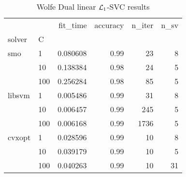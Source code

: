 \begin{table}[H]
\centering
\caption{Wolfe Dual linear $\protect \mathcal{L}_1$-SVC results}
\label{linear_dual_l1_svc_cv_results}
\begin{tabular}{llrrrr}
\toprule
       &     &  fit\_time &  accuracy &  n\_iter &  n\_sv \\
solver & C &           &           &         &       \\
\midrule
smo & 1   &  0.080608 &      0.99 &      23 &     8 \\
       & 10  &  0.138384 &      0.98 &      24 &     5 \\
       & 100 &  0.256284 &      0.98 &      85 &     5 \\
libsvm & 1   &  0.005486 &      0.99 &      31 &     8 \\
       & 10  &  0.006457 &      0.99 &     245 &     5 \\
       & 100 &  0.006168 &      0.99 &    1736 &     5 \\
cvxopt & 1   &  0.028596 &      0.99 &      10 &     8 \\
       & 10  &  0.039179 &      0.99 &      10 &     5 \\
       & 100 &  0.040263 &      0.99 &      10 &    31 \\
\bottomrule
\end{tabular}
\end{table}
